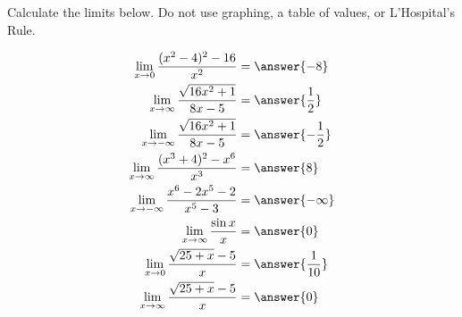 \documentclass{ximera}
\author{Nela Lakos \and Kyle Parsons}
\begin{document}
\begin{exercise}

Calculate the limits below.  Do not use graphing, a table of values, or L'Hospital's Rule.

\begin{align*}
\lim_{x\to0}\frac{(x^2-4)^2 - 16}{x^2} &= \answer{-8}\\
\lim_{x\to\infty}\frac{\sqrt{16x^2+1}}{8x-5} &= \answer{\frac{1}{2}}\\
\lim_{x\to-\infty}\frac{\sqrt{16x^2+1}}{8x-5} &= \answer{-\frac{1}{2}}\\
\lim_{x\to\infty}\frac{(x^3+4)^2 - x^6}{x^3} &= \answer{8}\\
\lim_{x\to-\infty}\frac{x^6-2x^5-2}{x^5-3} &= \answer{-\infty}\\
\lim_{x\to\infty}\frac{\sin x}{x} &= \answer{0}\\
\lim_{x\to0}\frac{\sqrt{25+x}-5}{x} &= \answer{\frac{1}{10}}\\
\lim_{x\to\infty}\frac{\sqrt{25+x}-5}{x} &= \answer{0}\\
\end{align*}

\end{exercise}
\end{document}

